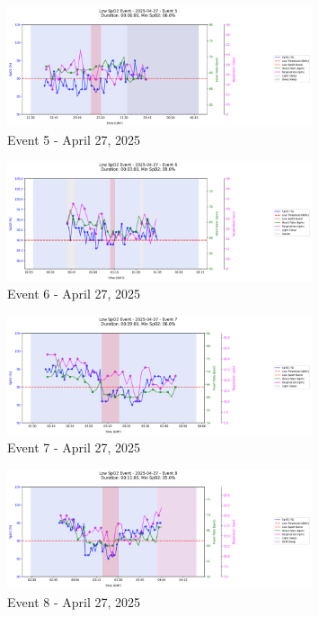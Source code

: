 \documentclass{article}
\begin{document}
\begin{figure}[htbp]
    \centering
    \includegraphics[width=0.8\textwidth]{images/2025-04-27_event_5.png}
    \caption{Event 5 - April 27, 2025}
\end{figure}
\begin{figure}[htbp]
    \centering
    \includegraphics[width=0.8\textwidth]{images/2025-04-27_event_6.png}
    \caption{Event 6 - April 27, 2025}
\end{figure}
\begin{figure}[htbp]
    \centering
    \includegraphics[width=0.8\textwidth]{images/2025-04-27_event_7.png}
    \caption{Event 7 - April 27, 2025}
\end{figure}
\begin{figure}[htbp]
    \centering
    \includegraphics[width=0.8\textwidth]{images/2025-04-27_event_8.png}
    \caption{Event 8 - April 27, 2025}
\end{figure}
\clearpage
\end{document}
